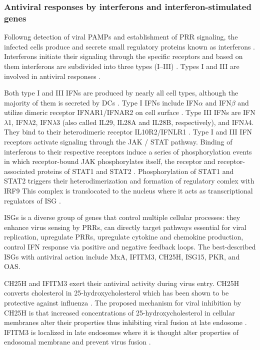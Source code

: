 		\subsubsection{Antiviral responses by interferons and interferon-stimulated genes}
		
		Followng detection of viral \gls{PAMP}s and establishment of \gls{PRR} signaling, the infected cells produce and secrete small regulatory proteins known as interferons \parencite{Fensterl2009}. Interferons initiate their signaling through the specific receptors and based on them interferons are subdivided into three types (I--III) \parencite{Branca1981, Sheppard2003}. Types I and III are involved in antiviral responses \parencite{Kotenko2003, Garcia-Sastre2006}.
		
		Both type I and III \gls{IFN}s are produced by nearly all cell types, although the majority of them is secreted by \gls{DC}s \parencite{Siegal1999, Odendall2014}. Type I \gls{IFN}s include \gls{IFN}$\alpha$ and \gls{IFN}$\beta$ and utilize dimeric receptor IFNAR1/IFNAR2 on cell surface \parencite{Mogensen1999}. Type III \gls{IFN}s are \gls{IFN}$\lambda$1, \gls{IFN}$\lambda$2, \gls{IFN}$\lambda$3 (also called \gls{IL}29, \gls{IL}28A and \gls{IL}28B, respectively), and \gls{IFN}$\lambda$4. They bind to their heterodimeric receptor IL10R2/IFNLR1 \parencite{Kotenko2003, Sheppard2003}. Type I and III \gls{IFN} receptors activate signaling through the \gls{JAK} / \gls{STAT} pathway. Binding of interferons to their respective receptors induce a series of phosphorylation events in which receptor-bound \gls{JAK} phosphorylates itself, the receptor and receptor-associated proteins of \gls{STAT}1 and \gls{STAT}2 \parencite{VanBoxel-Dezaire2006}. Phosphorylation of \gls{STAT}1 and \gls{STAT}2 triggers their heterodimerization and formation of regulatory comlex with \gls{IRF}9 \parencite{Fu1990} This complex is translocated to the nucleus where it acts as transcriptional regulators of \gls{ISG} \parencite{Levy1988}.
		
		\gls{ISG}s is a diverse group of genes that control multiple cellular processes: they enhance virus sensing by \gls{PRR}s, can directly target pathways essential for viral replication, upregulate \gls{PRR}s, upregulate cytokine and chemokine production, control \gls{IFN} response via positive and negative feedback loops. The best-described \gls{ISG}s with antiviral action include \gls{MxA}, \gls{IFITM3}, \gls{CH25H}, \gls{ISG15}, \gls{PKR}, and \gls{OAS}. 
		
		\gls{CH25H} and \gls{IFITM3} exert their antiviral activity during virus entry. \gls{CH25H} converts cholesterol in 25-hydroxycholesterol which has been shown to be protective against influenza \parencite{Blanc2013}. The proposed mechanism for viral inhibition by \gls{CH25H} is that increased concentrations of 25-hydroxycholesterol in cellular membranes alter their properties thus inhibiting viral fusion at late endosome \parencite{Liu2013}. \gls{IFITM3} is localized in late endosomes where it is thought alter properties of endosomal membrane and prevent virus fusion \parencite{Li2013, Desai2014}. 
				
